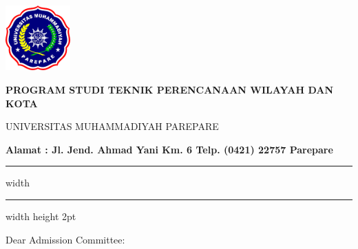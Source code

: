 \documentclass[12pt,a4paper]{lortwo}
\begin{document}


	\begin{minipage}[b]{0.13\linewidth}
			\includegraphics[height=2.5cm]{logo2.png}
	\end{minipage}
\begin{minipage}[b]{35em}
            \Centering
            \color{red}
	\begin{spacing}{1}
\textbf{PROGRAM STUDI TEKNIK PERENCANAAN WILAYAH DAN KOTA}

UNIVERSITAS MUHAMMADIYAH PAREPARE

\textbf{Alamat : Jl. Jend. Ahmad Yani Km. 6 Telp. (0421) 22757 Parepare}
	\end{spacing}
\end{minipage}

\vspace{0.2em}%

{\color{red}\hrule width \hsize \kern 1mm \hrule width \hsize height 2pt}



\hspace*{\longindentation}\DTMtoday\hspace*{\fill}\par %



\vspace{10pt}
Dear Admission Committee:
\end{document}
